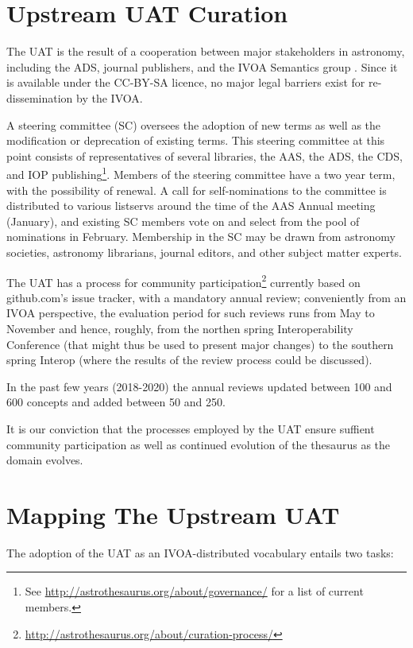 \documentclass[11pt,a4paper]{ivoa}
\begin{document}
\section{Upstream UAT Curation}

The UAT is the result of a cooperation between major stakeholders in
astronomy, including the ADS, journal publishers, and the IVOA Semantics
group \citep{2014ASPC..485..461A}.  Since it is available under the CC-BY-SA
licence, no major legal barriers exist for re-dissemination by the IVOA.

A steering committee (SC) oversees the adoption of new terms as well as the
modification or deprecation of existing terms.  This steering committee
at this point consists of representatives of several libraries, the AAS,
the ADS, the CDS, and IOP publishing\footnote{See
\url{http://astrothesaurus.org/about/governance/} for a list of current
members.}.  Members of the steering committee have a two year term, with
the possibility of renewal.  A call for self-nominations to the
committee is distributed to various listservs around the time of the AAS
Annual meeting (January), and existing SC members vote on and select
from the pool of nominations in February.  Membership in the SC may be
drawn from astronomy societies, astronomy librarians, journal editors,
and other subject matter experts.

The UAT has a process for community
participation\footnote{\url{http://astrothesaurus.org/about/curation-process/}}
currently based on github.com's issue tracker, with a mandatory annual
review; conveniently from an IVOA perspective, the evaluation period for
such reviews runs from May to November and hence, roughly, from the
northen spring Interoperability Conference (that 
might thus be used to present major
changes) to the southern spring Interop (where the results of the review
process could be discussed).

In the past few years (2018-2020) the annual reviews updated between 100
and 600 concepts and added between 50 and 250.

It is our conviction that the processes employed by the UAT ensure
suffient community participation as well as continued evolution of the
thesaurus as the domain evolves.

\section{Mapping The Upstream UAT}

The adoption of the UAT as an IVOA-distributed vocabulary entails two
tasks:
\end{document}
